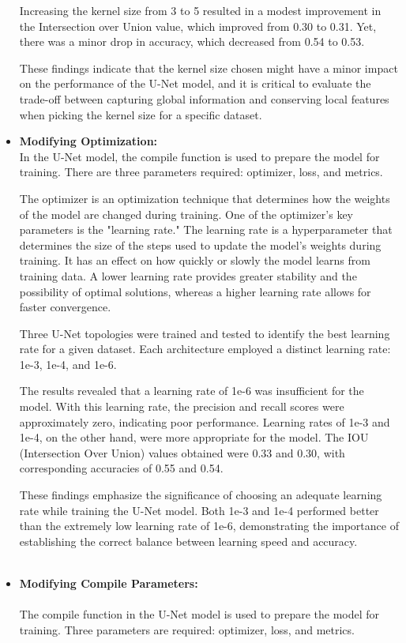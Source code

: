\documentclass[conference]{IEEEtran}
\begin{document}
\begin{itemize}
        Increasing the kernel size from 3 to 5 resulted in a modest improvement in the Intersection over Union value, which improved from 0.30 to 0.31. Yet, there was a minor drop in accuracy, which decreased from 0.54 to 0.53.
        
        These findings indicate that the kernel size chosen might have a minor impact on the performance of the U-Net model, and it is critical to evaluate the trade-off between capturing global information and conserving local features when picking the kernel size for a specific dataset.
        \\
    \item \textbf{Modifying Optimization:}\\
        
        In the U-Net model, the compile function is used to prepare the model for training. There are three parameters required: optimizer, loss, and metrics.

        The optimizer is an optimization technique that determines how the weights of the model are changed during training. One of the optimizer's key parameters is the "learning rate." The learning rate is a hyperparameter that determines the size of the steps used to update the model's weights during training. It has an effect on how quickly or slowly the model learns from training data. A lower learning rate provides greater stability and the possibility of optimal solutions, whereas a higher learning rate allows for faster convergence.
        
        Three U-Net topologies were trained and tested to identify the best learning rate for a given dataset. Each architecture employed a distinct learning rate: 1e-3, 1e-4, and 1e-6.
        
        The results revealed that a learning rate of 1e-6 was insufficient for the model. With this learning rate, the precision and recall scores were approximately zero, indicating poor performance. Learning rates of 1e-3 and 1e-4, on the other hand, were more appropriate for the model. The IOU (Intersection Over Union) values obtained were 0.33 and 0.30, with corresponding accuracies of 0.55 and 0.54.
        
        These findings emphasize the significance of choosing an adequate learning rate while training the U-Net model. Both 1e-3 and 1e-4 performed better than the extremely low learning rate of 1e-6, demonstrating the importance of establishing the correct balance between learning speed and accuracy.
        \\
        \\
    \item \textbf{Modifying Compile Parameters:}\\
        \\
        The compile function in the U-Net model is used to prepare the model for training. Three parameters are required: optimizer, loss, and metrics.


\end{itemize}
\end{document}
